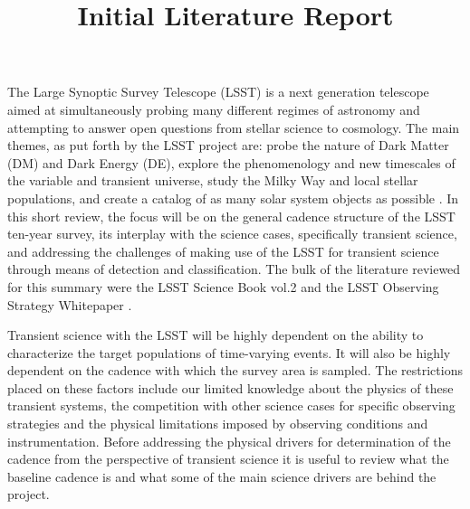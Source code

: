 \documentclass[12pt]{article}
\title{Initial Literature Report}
\begin{document}
\par

\vspace{7pt}
The Large Synoptic Survey Telescope (LSST) is a next generation telescope aimed at simultaneously probing many different regimes of astronomy and attempting to answer open questions from stellar science to cosmology. The main themes, as put forth by the LSST project are: probe the nature of Dark Matter (DM) and Dark Energy (DE), explore the phenomenology and new timescales of the variable and transient universe, study the Milky Way and local stellar populations, and create a catalog of as many solar system objects as possible \citep{LSSTScienceCollaboration2017}. In this short review, the focus will be on the general cadence structure of the LSST ten-year survey, its interplay with the science cases, specifically transient science, and addressing the challenges of making use of the LSST for transient science through means of detection and classification. The bulk of the literature reviewed for this summary were the LSST Science Book vol.2 and the LSST Observing Strategy Whitepaper \citep{LSSTScienceCollaboration2009,LSSTScienceCollaboration2017}. \par
Transient science with the LSST will be highly dependent on the ability to characterize the target populations of time-varying events. It will also be highly dependent on the cadence with which the survey area is sampled. The restrictions placed on these factors include our limited knowledge about the physics of these transient systems, the competition with other science cases for specific observing strategies and the physical limitations imposed by observing conditions and instrumentation. Before addressing the physical drivers for determination of the cadence from the perspective of transient science it is useful to review what the baseline cadence is and what some of the main science drivers are behind the project. \par
\end{document}
